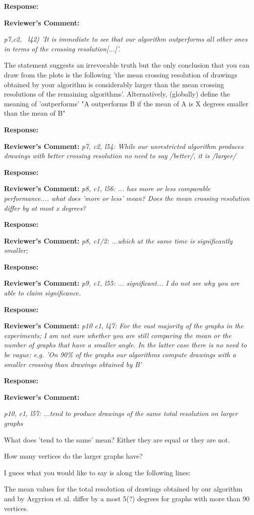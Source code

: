 \documentclass{article}
\newcommand{\tcomment}[1]{\vspace{0.3cm} {\color{red} \item \textbf{Reviewer's Comment:} {\em #1}}}
\newcommand{\response}{\vspace{0.2cm} \textbf{Response: }}
\begin{document}
\begin{itemize}
\response{}

\tcomment{p7,c2, ~l42) 'It is immediate to see that our algorithm outperforms all other ones in terms of the crossing resolution[...]'.

The statement suggests an irrevocable truth but the only conclusion that you can draw from the plots is the following 'the mean crossing resolution of drawings obtained by your algorithm is considerably larger than the mean crossing resolutions of the remaining algorithms'. Alternatively, (globally) define the meaning of 'outperforms' "A outperforms B if the mean of A is X degrees smaller than the mean of B"}

\response{}

\tcomment{p7, c2, l54: While our unrestricted algorithm produces drawings with better crossing resolution no need to say /better/, it is /larger/}

\response{}

\tcomment{p8, c1, l56: ... has more or less comparable performance.... what does 'more or less' mean? Does the mean crossing resolution differ by at most x degrees?}

\response{}

\tcomment{p8, c1/2: ...which at the same time is significantly smaller;}

\response{}

\tcomment{p9, c1, l55: ... significant... I do not see why you are able to claim significance.}

\response{}

\tcomment{p10 c1, l47: For the vast majority of the graphs in the experiments; I am not sure whether you are still comparing the mean or the number of graphs that have a smaller angle. In the latter case there is no need to be vague: e.g. 'On 90\% of the graphs our algorithms compute drawings with a smaller crossing than drawings obtained by B'}

\response{}


\tcomment{p10, c1, l57: ...tend to produce drawings of the same total resolution on larger graphs 

What does 'tend to the same' mean? Either they are equal or they are not. 

How many vertices do the larger graphs have?    

I guess what you would like to say is along the following lines:

The mean values for the total resolution of drawings obtained by our algorithm and by Argyriou et al. differ by a most 5(?) degrees for graphs with more than 90 vertices.}


\end{itemize}
\end{document}
